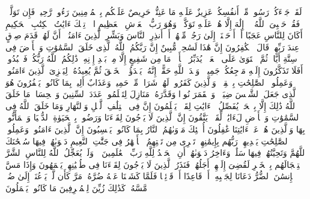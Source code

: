 \stopbuffer%
\startbuffer[\q:9:128]
لَقَدۡ جَاۤءَكُمۡ رَسُولࣱ مِّنۡ أَنفُسِكُمۡ عَزِیزٌ عَلَیۡهِ مَا عَنِتُّمۡ حَرِیصٌ عَلَیۡكُم بِٱلۡمُؤۡمِنِینَ رَءُوفࣱ رَّحِیمࣱ%
\stopbuffer%
\startbuffer[\q:9:129]
فَإِن تَوَلَّوۡا۟ فَقُلۡ حَسۡبِیَ ٱللَّهُ لَاۤ إِلَٰهَ إِلَّا هُوَۖ عَلَیۡهِ تَوَكَّلۡتُۖ وَهُوَ رَبُّ ٱلۡعَرۡشِ ٱلۡعَظِیمِ%
\stopbuffer%
\startbuffer[\q:10:1]
الۤرۚ تِلۡكَ ءَایَٰتُ ٱلۡكِتَٰبِ ٱلۡحَكِیمِ%
\stopbuffer%
\startbuffer[\q:10:2]
أَكَانَ لِلنَّاسِ عَجَبًا أَنۡ أَوۡحَیۡنَاۤ إِلَىٰ رَجُلࣲ مِّنۡهُمۡ أَنۡ أَنذِرِ ٱلنَّاسَ وَبَشِّرِ ٱلَّذِینَ ءَامَنُوۤا۟ أَنَّ لَهُمۡ قَدَمَ صِدۡقٍ عِندَ رَبِّهِمۡۗ قَالَ ٱلۡكَٰفِرُونَ إِنَّ هَٰذَا لَسَٰحِرࣱ مُّبِینٌ%
\stopbuffer%
\startbuffer[\q:10:3]
إِنَّ رَبَّكُمُ ٱللَّهُ ٱلَّذِی خَلَقَ ٱلسَّمَٰوَٰتِ وَٱلۡأَرۡضَ فِی سِتَّةِ أَیَّامࣲ ثُمَّ ٱسۡتَوَىٰ عَلَى ٱلۡعَرۡشِۖ یُدَبِّرُ ٱلۡأَمۡرَۖ مَا مِن شَفِیعٍ إِلَّا مِنۢ بَعۡدِ إِذۡنِهِۦۚ ذَٰلِكُمُ ٱللَّهُ رَبُّكُمۡ فَٱعۡبُدُوهُۚ أَفَلَا تَذَكَّرُونَ%
\stopbuffer%
\startbuffer[\q:10:4]
إِلَیۡهِ مَرۡجِعُكُمۡ جَمِیعࣰاۖ وَعۡدَ ٱللَّهِ حَقًّاۚ إِنَّهُۥ یَبۡدَؤُا۟ ٱلۡخَلۡقَ ثُمَّ یُعِیدُهُۥ لِیَجۡزِیَ ٱلَّذِینَ ءَامَنُوا۟ وَعَمِلُوا۟ ٱلصَّٰلِحَٰتِ بِٱلۡقِسۡطِۚ وَٱلَّذِینَ كَفَرُوا۟ لَهُمۡ شَرَابࣱ مِّنۡ حَمِیمࣲ وَعَذَابٌ أَلِیمُۢ بِمَا كَانُوا۟ یَكۡفُرُونَ%
\stopbuffer%
\startbuffer[\q:10:5]
هُوَ ٱلَّذِی جَعَلَ ٱلشَّمۡسَ ضِیَاۤءࣰ وَٱلۡقَمَرَ نُورࣰا وَقَدَّرَهُۥ مَنَازِلَ لِتَعۡلَمُوا۟ عَدَدَ ٱلسِّنِینَ وَٱلۡحِسَابَۚ مَا خَلَقَ ٱللَّهُ ذَٰلِكَ إِلَّا بِٱلۡحَقِّۚ یُفَصِّلُ ٱلۡءَایَٰتِ لِقَوۡمࣲ یَعۡلَمُونَ%
\stopbuffer%
\startbuffer[\q:10:6]
إِنَّ فِی ٱخۡتِلَٰفِ ٱلَّیۡلِ وَٱلنَّهَارِ وَمَا خَلَقَ ٱللَّهُ فِی ٱلسَّمَٰوَٰتِ وَٱلۡأَرۡضِ لَءَایَٰتࣲ لِّقَوۡمࣲ یَتَّقُونَ%
\stopbuffer%
\startbuffer[\q:10:7]
إِنَّ ٱلَّذِینَ لَا یَرۡجُونَ لِقَاۤءَنَا وَرَضُوا۟ بِٱلۡحَیَوٰةِ ٱلدُّنۡیَا وَٱطۡمَأَنُّوا۟ بِهَا وَٱلَّذِینَ هُمۡ عَنۡ ءَایَٰتِنَا غَٰفِلُونَ%
\stopbuffer%
\startbuffer[\q:10:8]
أُو۟لَٰۤئِكَ مَأۡوَىٰهُمُ ٱلنَّارُ بِمَا كَانُوا۟ یَكۡسِبُونَ%
\stopbuffer%
\startbuffer[\q:10:9]
إِنَّ ٱلَّذِینَ ءَامَنُوا۟ وَعَمِلُوا۟ ٱلصَّٰلِحَٰتِ یَهۡدِیهِمۡ رَبُّهُم بِإِیمَٰنِهِمۡۖ تَجۡرِی مِن تَحۡتِهِمُ ٱلۡأَنۡهَٰرُ فِی جَنَّٰتِ ٱلنَّعِیمِ%
\stopbuffer%
\startbuffer[\q:10:10]
دَعۡوَىٰهُمۡ فِیهَا سُبۡحَٰنَكَ ٱللَّهُمَّ وَتَحِیَّتُهُمۡ فِیهَا سَلَٰمࣱۚ وَءَاخِرُ دَعۡوَىٰهُمۡ أَنِ ٱلۡحَمۡدُ لِلَّهِ رَبِّ ٱلۡعَٰلَمِینَ%
\stopbuffer%
\startbuffer[\q:10:11]
۞ وَلَوۡ یُعَجِّلُ ٱللَّهُ لِلنَّاسِ ٱلشَّرَّ ٱسۡتِعۡجَالَهُم بِٱلۡخَیۡرِ لَقُضِیَ إِلَیۡهِمۡ أَجَلُهُمۡۖ فَنَذَرُ ٱلَّذِینَ لَا یَرۡجُونَ لِقَاۤءَنَا فِی طُغۡیَٰنِهِمۡ یَعۡمَهُونَ%
\stopbuffer%
\startbuffer[\q:10:12]
وَإِذَا مَسَّ ٱلۡإِنسَٰنَ ٱلضُّرُّ دَعَانَا لِجَنۢبِهِۦۤ أَوۡ قَاعِدًا أَوۡ قَاۤئِمࣰا فَلَمَّا كَشَفۡنَا عَنۡهُ ضُرَّهُۥ مَرَّ كَأَن لَّمۡ یَدۡعُنَاۤ إِلَىٰ ضُرࣲّ مَّسَّهُۥۚ كَذَٰلِكَ زُیِّنَ لِلۡمُسۡرِفِینَ مَا كَانُوا۟ یَعۡمَلُونَ%
